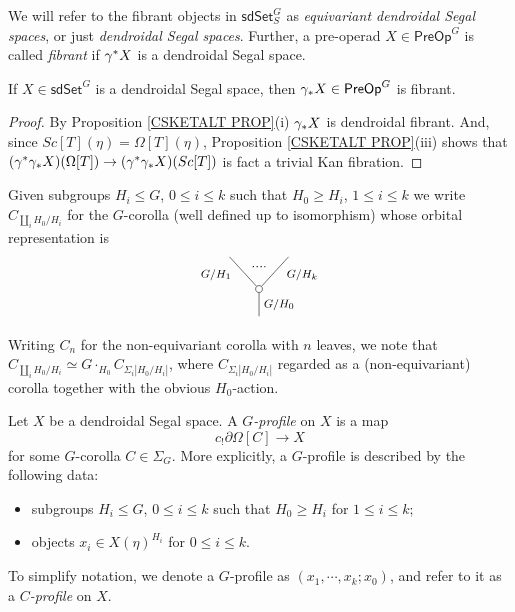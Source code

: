 \documentclass[a4paper,10pt
,draft
]{article}%
\begin{document}
\begin{notation}\label{FIB_PREOP_NOT}
We will refer to the fibrant objects in 
$\mathsf{sdSet}^G_S$
as \textit{equivariant dendroidal Segal spaces}, 
or just \textit{dendroidal Segal spaces}.
Further, a pre-operad $X \in \mathsf{PreOp}^G$ is called \textit{fibrant}
if $\gamma^{\**}X$ is a dendroidal Segal space.
\end{notation}


\begin{proposition}
If $X \in \mathsf{sdSet}^G$ is a dendroidal Segal space, then
$\gamma_{\**}X \in \mathsf{PreOp}^G$ is fibrant.
\end{proposition}

\begin{proof}
	By Proposition \ref{CSKETALT PROP}(i) $\gamma_{\**}X$ is dendroidal fibrant. And, since 
	$Sc[T](\eta)=\Omega[T](\eta)$,
	Proposition \ref{CSKETALT PROP}(iii) shows that 
	$(\gamma^{\**}\gamma_{\**}X)(\Omega[T]) \to 
	(\gamma^{\**} \gamma_{\**}X)(Sc[T])$
	is fact a trivial Kan fibration.
\end{proof}


\begin{notation}\label{GCOR NOT}
Given subgroups $H_i \leq G$, $0\leq i \leq k$ such that
$H_0 \geq H_i$, $1 \leq i \leq k$ we write
$C_{\amalg_i H_0/H_i}$ for the $G$-corolla (well defined up to isomorphism)
whose orbital representation is
\[
\begin{tikzpicture}
[grow=up,auto,level distance=2.3em,every node/.style = {font=\footnotesize},dummy/.style={circle,draw,inner sep=0pt,minimum size=1.75mm}]
	\node at (0,0) {}
		child{node [dummy] {}
			child{
			edge from parent node [swap,near end] {$G/H_k$} node [name=Kn] {}}
			child{
			edge from parent node [near end] {$G/H_1$}
node [name=Kone,swap] {}}
		edge from parent node [swap] {$G/H_0$}
		};
		\draw [dotted,thick] (Kone) -- (Kn) ;
\end{tikzpicture}
\]
Writing $C_n$ for the non-equivariant corolla with $n$ leaves, we note that
$C_{\amalg_i H_0/H_i} \simeq 
G \cdot_{H_0} C_{\Sigma_i |H_0/H_i|}$,
where $C_{\Sigma_i |H_0/H_i|}$ regarded as a (non-equivariant) corolla together with the obvious $H_0$-action.
\end{notation}


\begin{definition}\label{PROF DEF}
      Let $X$ be a dendroidal Segal space.
      A \textit{$G$-profile} on $X$ is a map
      \[
            c_! \partial \Omega[C] \to X
      \]
      for some $G$-corolla $C \in \Sigma_G$. 
      More explicitly, a $G$-profile is described by the following data:
      \begin{itemize}
      \item subgroups $H_i \leq G$, $0\leq i \leq k$ such that
            $H_0 \geq H_i$ for $1 \leq i \leq k$;
      \item objects $x_i \in X(\eta)^{H_i}$ for $0 \leq i \leq k$.
      \end{itemize}
      To simplify notation, we denote a $G$-profile as 
      $(x_1,\cdots,x_k;x_0)$, and refer to it as a 
      \textit{$C$-profile} on $X$.
\end{definition}
\end{document}
